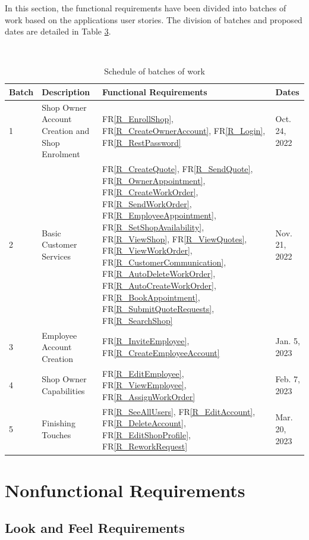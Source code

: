 \documentclass[12pt]{article}
\begin{document}
In this section, the functional requirements have been divided into batches of work based on the applications user stories. The division of batches and proposed dates are detailed in Table \hyperref[tab:phaseInPlan]{3}.

\begin{table}[ht!]
  \caption{Schedule of batches of work} \\
  \label{tab:phaseInPlan}
  \centering
  \begin{tabular}{l|p{}|p{}|p{}}
  \toprule
  \textbf{Batch} & \textbf{Description} & \textbf{Functional Requirements} & \textbf{Dates}\\
  \midrule
  1 & Shop Owner Account Creation and Shop Enrolment & FR\ref{R_EnrollShop}, FR\ref{R_CreateOwnerAccount}, FR\ref{R_Login}, FR\ref{R_RestPassword} & Oct. 24, 2022\\
  \hline
  2 & Basic Customer Services & FR\ref{R_CreateQuote}, FR\ref{R_SendQuote}, FR\ref{R_OwnerAppointment}, FR\ref{R_CreateWorkOrder}, FR\ref{R_SendWorkOrder}, FR\ref{R_EmployeeAppointment}, FR\ref{R_SetShopAvailability}, FR\ref{R_ViewShop}, FR\ref{R_ViewQuotes}, FR\ref{R_ViewWorkOrder}, FR\ref{R_CustomerCommunication}, FR\ref{R_AutoDeleteWorkOrder}, FR\ref{R_AutoCreateWorkOrder}, FR\ref{R_BookAppointment}, FR\ref{R_SubmitQuoteRequests}, FR\ref{R_SearchShop} & Nov. 21, 2022\\
  \hline
  3 & Employee Account Creation & FR\ref{R_InviteEmployee}, FR\ref{R_CreateEmployeeAccount} & Jan. 5, 2023 \\
  \hline
  4 & Shop Owner Capabilities & FR\ref{R_EditEmployee}, FR\ref{R_ViewEmployee}, FR\ref{R_AssignWorkOrder} & Feb. 7, 2023\\
  \hline
  5 & Finishing Touches & FR\ref{R_SeeAllUsers}, FR\ref{R_EditAccount}, FR\ref{R_DeleteAccount}, FR\ref{R_EditShopProfile}, FR\ref{R_ReworkRequest} & Mar. 20, 2023\\
  \bottomrule
  \end{tabular}
  
\end{table}

\section{Nonfunctional Requirements} 
\label{sec:NFuncReq}

\subsection{Look and Feel Requirements}
\end{document}
